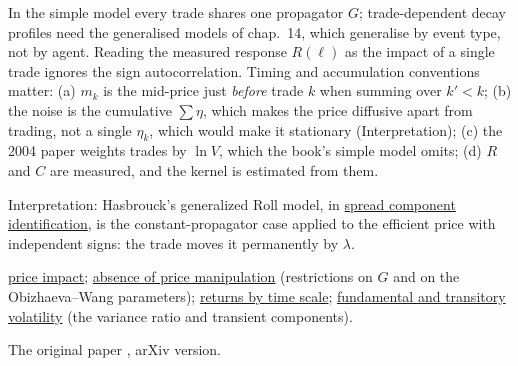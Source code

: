 \begin{qfmodel}
 In the simple model every trade shares one propagator $G$; trade-dependent decay profiles need the generalised models of chap.~14, which generalise by event type, not by agent. Reading the measured response $R(\ell)$ as the impact of a single trade ignores the sign autocorrelation. Timing and accumulation conventions matter: (a) $m_k$ is the mid-price just \emph{before} trade $k$ when summing over $k'<k$; (b) the noise is the cumulative $\sum\eta$, which makes the price diffusive apart from trading, not a single $\eta_k$, which would make it stationary (Interpretation); (c) the 2004 paper weights trades by $\ln V$, which the book's simple model omits; (d) $R$ and $C$ are measured, and the kernel is estimated from them.

Interpretation: Hasbrouck's generalized Roll model, in \hyperref[res:spread-component-identification]{spread component identification}, is the constant-propagator case applied to the efficient price with independent signs: the trade moves it permanently by $\lambda$.

 \hyperref[def:price-impact]{price impact}; \hyperref[res:no-price-manipulation]{absence of price manipulation} (restrictions on $G$ and on the Obizhaeva--Wang parameters); \hyperref[def:intraday-overnight-returns]{returns by time scale}; \hyperref[def:volatility-components]{fundamental and transitory volatility} (the variance ratio and transient components).

 The original paper \citep{wide-bouchaud-propagator}, arXiv version.

\end{qfmodel}

